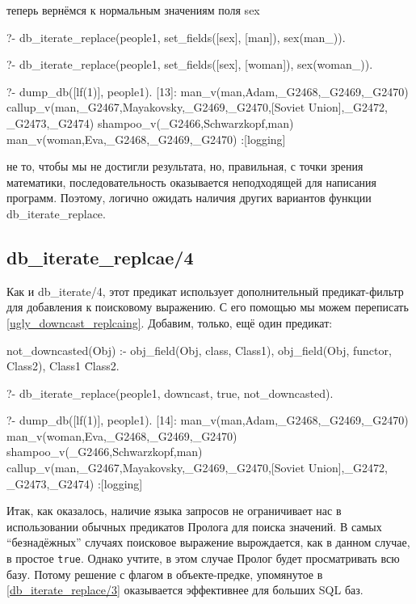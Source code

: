 \documentclass[a4paper]{book}
\begin{document}
теперь вернёмся к нормальным значениям поля sex

\begin{example}{}{}
?- db_iterate_replace(people1, 
      set_fields([sex], [man]), sex(man_)).

?- db_iterate_replace(people1, 
      set_fields([sex], [woman]), sex(woman_)).

?- dump_db([lf(1)], people1).
[13]: man_v(man,Adam,_G2468,_G2469,_G2470) 
callup_v(man,_G2467,Mayakovsky,_G2469,_G2470,[Soviet Union],_G2472,
_G2473,_G2474)                                                    
shampoo_v(_G2466,Schwarzkopf,man) 
man_v(woman,Eva,_G2468,_G2469,_G2470) 
 :[logging]
\end{example}

не то, чтобы мы не достигли результата, но, правильная, с точки
зрения математики, последовательность оказывается неподходящей
для написания программ. Поэтому, логично ожидать наличия других
вариантов функции db_iterate_replace.

\subsection{db_iterate_replcae/4}

Как и db_iterate/4, этот предикат использует дополнительный
предикат-фильтр для добавления к поисковому выражению. С его
помощью мы можем переписать
\ref{ugly_downcast_replcaing}. Добавим, только, ещё один
предикат:

\begin{example}{}{}
not_downcasted(Obj) :- 
   obj_field(Obj, class, Class1),
   obj_field(Obj, functor, Class2),
   Class1 \= Class2.
\end{example}

\begin{example}{}{}
?- db_iterate_replace(people1, downcast, true, not_downcasted).

?- dump_db([lf(1)], people1).
[14]: man_v(man,Adam,_G2468,_G2469,_G2470) 
man_v(woman,Eva,_G2468,_G2469,_G2470) 
shampoo_v(_G2466,Schwarzkopf,man) 
callup_v(man,_G2467,Mayakovsky,_G2469,_G2470,[Soviet Union],_G2472,
_G2473,_G2474)                                                    
 :[logging]
\end{example}

Итак, как оказалось, наличие языка запросов не ограничивает нас в
использовании обычных предикатов Пролога для поиска значений. В
самых ``безнадёжных'' случаях поисковое выражение вырождается,
как в данном случае, в простое \verb|true|. Однако учтите, в этом
случае Пролог будет просматривать всю базу. Потому решение с
флагом в объекте-предке, упомянутое в \ref{db_iterate_replace/3}
оказывается эффективнее для больших SQL баз.
\end{document}
